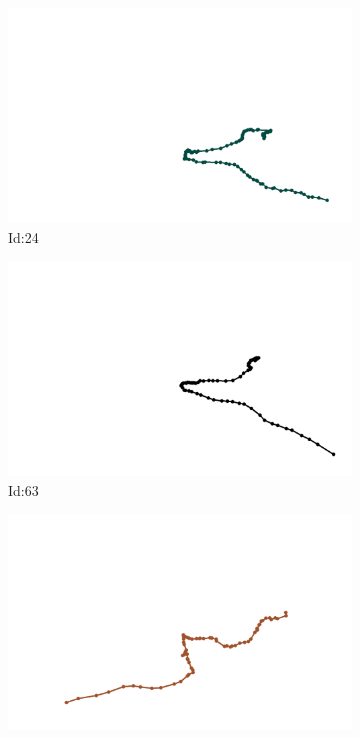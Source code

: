 \documentclass[12pt,twoside]{report}
\begin{document}
\begin{figure}
\centering
\begin{subfigure}[b]{0.20\textwidth}
\centering
\includegraphics[width=\textwidth]{../../trajectories/24.png}
\caption{Id:24}
\end{subfigure}
\begin{subfigure}[b]{0.20\textwidth}
\centering
\includegraphics[width=\textwidth]{../../trajectories/63.png}
\caption{Id:63}
\end{subfigure}
\begin{subfigure}[b]{0.20\textwidth}
\centering
\includegraphics[width=\textwidth]{../../trajectories/79.png}

\end{subfigure}
\end{figure}
\end{document}
